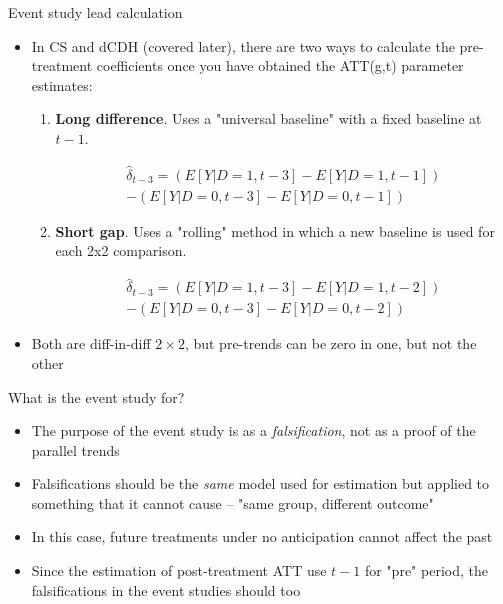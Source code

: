 \documentclass{beamer}
\begin{document}
\begin{frame}{Event study lead calculation}

\begin{itemize}

\item In CS and dCDH (covered later), there are two ways to calculate the pre-treatment coefficients once you have obtained the ATT(g,t) parameter estimates:
	\begin{enumerate}
	\item \textbf{Long difference}. Uses a "universal baseline" with a fixed baseline at \( t-1 \).
	
	\begin{eqnarray*}
	 \widehat{\delta}_{t-3} = \left( E[Y|D=1, t-3] - E[Y|D=1, t-1] \right) \\
	 - \left( E[Y|D=0, t-3] - E[Y|D=0, t-1] \right)
	 \end{eqnarray*}


	\item \textbf{Short gap}. Uses a "rolling" method in which a new baseline is used for each 2x2 comparison.
	
	\begin{eqnarray*}
	 \widehat{\delta}_{t-3} = \left( E[Y|D=1, t-3] - E[Y|D=1, t-2] \right) \\
	 - \left( E[Y|D=0, t-3] - E[Y|D=0, t-2] \right)
	 \end{eqnarray*}
	 
	 \end{enumerate}
	 
 \item Both are diff-in-diff $2 \times 2$, but pre-trends can be zero in one, but not the other
	 
\end{itemize}

\end{frame}





\begin{frame}{What is the event study for?}

\begin{itemize}

\item The purpose of the event study is as a \emph{falsification}, not as a proof of the parallel trends
\item Falsifications should be the \emph{same} model used for estimation but applied to something that it cannot cause -- "same group, different outcome"
\item In this case, future treatments under no anticipation cannot affect the past
\item Since the estimation of post-treatment ATT use $t-1$ for "pre" period, the falsifications in the event studies should too 
\end{itemize}

\end{frame}
\end{document}
